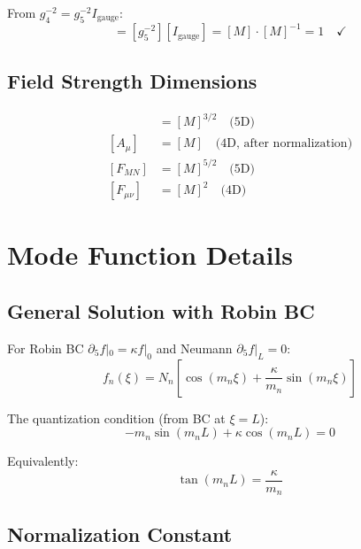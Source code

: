 \documentclass[11pt,a4paper]{article}
\begin{document}
From $g_4^{-2} = g_5^{-2} I_{\text{gauge}}$:
\begin{equation}
  [g_4^{-2}] = [g_5^{-2}] [I_{\text{gauge}}] = [M] \cdot [M]^{-1} = 1 \quad \checkmark
  \label{eq:dim-check-coupling}
\end{equation}

\subsection{Field Strength Dimensions}

\begin{align}
  [A_M] &= [M]^{3/2} \quad \text{(5D)} \label{eq:dim-AM} \\
  [A_\mu] &= [M] \quad \text{(4D, after normalization)} \label{eq:dim-Amu} \\
  [F_{MN}] &= [M]^{5/2} \quad \text{(5D)} \label{eq:dim-FMN} \\
  [F_{\mu\nu}] &= [M]^2 \quad \text{(4D)} \label{eq:dim-Fmunu-4d}
\end{align}

\section{Mode Function Details}
\label{app:modes}

\subsection{General Solution with Robin BC}

For Robin BC $\partial_5 f|_0 = \kappa f|_0$ and Neumann $\partial_5 f|_L = 0$:
\begin{equation}
  f_n(\xi) = N_n \left[ \cos(m_n \xi) + \frac{\kappa}{m_n} \sin(m_n \xi) \right]
  \label{eq:robin-mode}
\end{equation}

The quantization condition (from BC at $\xi = L$):
\begin{equation}
  -m_n \sin(m_n L) + \kappa \cos(m_n L) = 0
  \label{eq:robin-quantization}
\end{equation}

Equivalently:
\begin{equation}
  \tan(m_n L) = \frac{\kappa}{m_n}
  \label{eq:robin-tan}
\end{equation}

\subsection{Normalization Constant}
\end{document}

